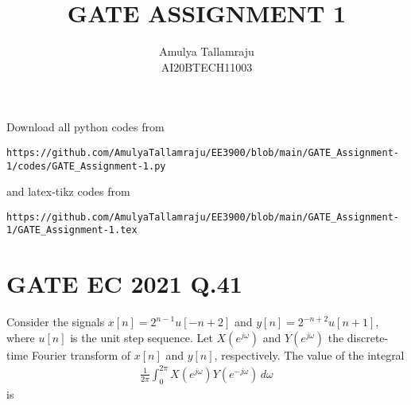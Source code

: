 \documentclass[journal,12pt,twocolumn]{IEEEtran}
\begin{document}
     \def\centbox#1{\makebox[0in]{#1}}
     \def\topbox#1{\raisebox{-\baselineskip}[0in][0in]{#1}}
     \def\midbox#1{\raisebox{-0.5\baselineskip}[0in][0in]{#1}}
\vspace{3cm}
\title{GATE ASSIGNMENT 1}
\author{Amulya Tallamraju \\ AI20BTECH11003}
\maketitle
\newpage
\bigskip
\renewcommand{\thefigure}{\theenumi}
\renewcommand{\thetable}{\theenumi}
Download all python codes from 
\begin{lstlisting}
https://github.com/AmulyaTallamraju/EE3900/blob/main/GATE_Assignment-1/codes/GATE_Assignment-1.py
\end{lstlisting}
%
and latex-tikz codes from 
%
\begin{lstlisting}
https://github.com/AmulyaTallamraju/EE3900/blob/main/GATE_Assignment-1/GATE_Assignment-1.tex
\end{lstlisting}
%
\section{GATE EC 2021 Q.41}
Consider  the  signals  $x[n]=2^{n-1}u[-n+2]$ and $y[n]=2^{-n+2}u[n+1]$, 
where $u[n]$ is the unit step sequence. Let $X(e^{j\omega})$ and $Y(e^{j\omega})$ the discrete-time  Fourier  transform  of  $x[n]$  and  $y[n]$,  respectively.  The  value  of  the 
integral 
\begin{align}
    \frac{1}{2\pi} \int_{0}^{2\pi} X(e^{j\omega}) Y(e^{-j\omega}) \, d\omega
\end{align}
is
%
\end{document}
